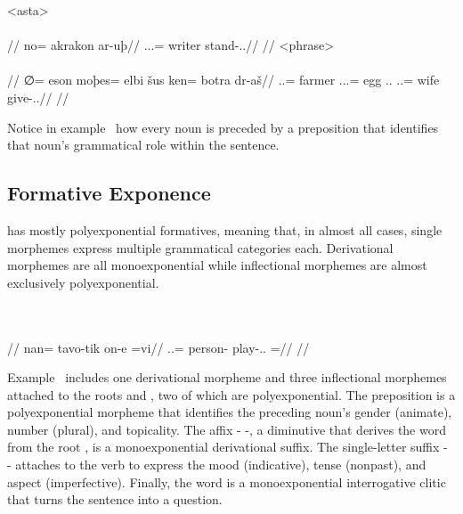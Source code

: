 	\a<asta>\begingl
		\glpreamble{}\\
		\\
		//
		\gla no= akrakon ar-uþ//
		\glb \An.\Sg.\Top.\Abs= writer stand-\Ind.\Npst.\Prg//
		\glft{}//
	\endgl
	\a<phrase>\begingl
		\glpreamble{}\\
		\\
		//
		\gla ∅= eson moþes= elbi šus ken= botra dr-aš//
		\glb \An.\Sg.\Abs= farmer \In.\Pc.\Top.\Acc= egg \Tps.\An.\Gen{} \An.\Pl.\Dat= wife give-\Ind.\Npst.\Rtsp//
		\glft{}//
	\endgl
\xe

Notice in example~ how every noun is preceded by a preposition that identifies that noun's grammatical role within the sentence.


\subsection{Formative Exponence}
\label{subsec:tvk-exponence}

\langtvk{} has mostly polyexponential formatives, meaning that, in almost all cases, single morphemes express multiple grammatical categories each\autocite{wals-21}. Derivational morphemes are all monoexponential while inflectional morphemes are almost exclusively polyexponential.

	\begingl
		\glpreamble{}\\
		\\
		//
		\gla nan= tavo-tik on-e =vi//
		\glb \An.\Pl.\Top= person-\Dim{} play-\Ind.\Npst.\Ipfv{} =\Q//
		\glft{}//
	\endgl
\xe

Example~ includes one derivational morpheme and three inflectional morphemes attached to the roots   and  , two of which are polyexponential. The preposition   is a polyexponential morpheme that identifies the preceding noun's gender (animate), number (plural), and topicality. The affix - -, a diminutive that derives the word  from the root , is a monoexponential derivational suffix. The single-letter suffix - - attaches to the verb to express the mood (indicative), tense (nonpast), and aspect (imperfective). Finally, the word   is a monoexponential interrogative clitic that turns the sentence into a question.

